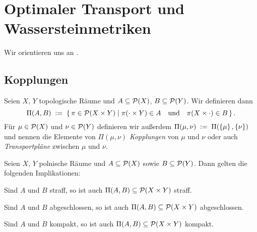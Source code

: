 \documentclass[../main/main.tex]{subfiles}
\begin{document}
	
	\section{Optimaler Transport und Wassersteinmetriken}
	
	Wir orientieren uns an \cite{Villani.2009}.
	
	\subsection{Kopplungen}
	
	\begin{Definition}[Kopplung]
		Seien $X$, $Y$ topologische Räume und $A \subseteq \mathcal{P}(X)$, $B \subseteq \mathcal{P}(Y)$. Wir definieren dann
		\[ \Pi(A, B) \; \vcentcolon = \; \left\{\, \pi \in \mathcal{P}(X \times Y) \; \middle| \; \pi(\cdot \times Y) \in A \quad \text{und} \quad \pi(X \times \cdot) \in B \,\right\} \text{.}\]
		Für $\mu \in \mathcal{P}(X)$ und $\nu \in \mathcal{P}(Y)$ definieren wir außerdem $\Pi(\mu, \nu) \; \vcentcolon = \; \Pi(\left\{\mu\right\}, \left\{\nu\right\})$ und nennen die
		Elemente von $\Pi(\mu, \nu)$ \emph{Kopplungen} von $\mu$ und $\nu$ oder auch \emph{Transportpläne} zwischen $\mu$ und $\nu$.
	\end{Definition}

	\begin{Hilfssatz}
		\label{lem:couplingsproperties}
		Seien $X$, $Y$ polnische Räume und $A \subseteq \mathcal{P}(X)$ sowie $B \subseteq \mathcal{P}(Y)$. Dann gelten die folgenden Implikationen:
		\begin{enumeratethm}
			\item Sind $A$ und $B$ straff, so ist auch $\Pi(A, B) \subseteq \mathcal{P}(X \times Y)$ straff.
			\item Sind $A$ und $B$ abgeschlossen, so ist auch $\Pi(A, B) \subseteq \mathcal{P}(X \times Y)$ abgeschlossen.
			\item Sind $A$ und $B$ kompakt, so ist auch $\Pi(A, B) \subseteq \mathcal{P}(X \times Y)$ kompakt.
		\end{enumeratethm}
	\end{Hilfssatz}
\end{document}
